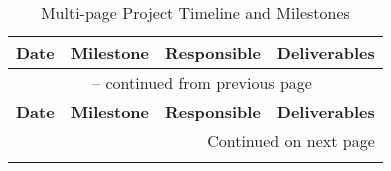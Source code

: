 \documentclass[a4paper,11pt,xetex]{article}
\begin{document}
\begin{longtable}{p{2cm}p{4cm}p{3cm}p{4cm}}
\caption{Multi-page Project Timeline and Milestones} \\
\rowcolor{headerbg}
\textcolor{headertext}{\textbf{Date}} &
\textcolor{headertext}{\textbf{Milestone}} &
\textcolor{headertext}{\textbf{Responsible}} &
\textcolor{headertext}{\textbf{Deliverables}} \\
\toprule
\endfirsthead

\multicolumn{4}{c}{\tablename\ \thetable{} -- continued from previous page} \\
\rowcolor{headerbg}
\textcolor{headertext}{\textbf{Date}} &
\textcolor{headertext}{\textbf{Milestone}} &
\textcolor{headertext}{\textbf{Responsible}} &
\textcolor{headertext}{\textbf{Deliverables}} \\
\toprule
\endhead

\midrule \multicolumn{4}{r}{Continued on next page} \\
\endfoot

\bottomrule
\endlastfoot


\end{longtable}
\end{document}
